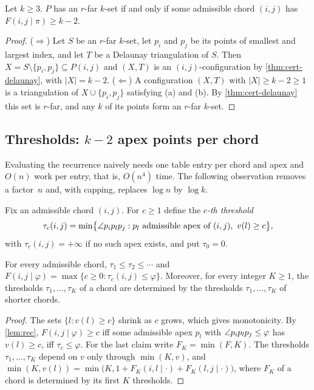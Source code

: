 \begin{theorem}[Decision]\label{thm:decision}
Let $k\ge3$. $P$ has an $r$-far $k$-set if and only if some admissible chord
$(i,j)$ has $F(i,j\mid\pi)\ge k-2$.
\end{theorem}
\begin{proof}
($\Rightarrow$) Let $S$ be an $r$-far $k$-set, let $p_i$ and $p_j$ be its
points of smallest and largest index, and let $T$ be a Delaunay triangulation
of $S$. Then $X=S\setminus\{p_i,p_j\}\subseteq P(i,j)$ and $(X,T)$ is an
$(i,j)$-configuration by \cref{thm:cert-delaunay}, with $|X|=k-2$.
($\Leftarrow$) A configuration $(X,T)$ with $|X|\ge k-2\ge 1$ is a
triangulation of $X\cup\{p_i,p_j\}$ satisfying (a) and (b). By
\cref{thm:cert-delaunay} this set is $r$-far, and any $k$ of its points form
an $r$-far $k$-set.
\end{proof}

\subsection{Thresholds: \texorpdfstring{$k-2$}{k-2} apex points per chord}

Evaluating the recurrence naively needs one table entry per chord and apex and
$O(n)$ work per entry, that is, $O(n^4)$ time. The following observation
removes a factor~$n$ and, with capping, replaces $\log n$ by $\log k$.

Fix an admissible chord $(i,j)$. For $c\ge1$ define the \emph{$c$-th
threshold}
\[
\tau_c(i,j)=\min\bigl\{\angle p_ip_lp_j : p_l\text{ admissible apex of }(i,j),\ v(l)\ge c\bigr\},
\]
with $\tau_c(i,j)=+\infty$ if no such apex exists, and put $\tau_0=0$.

\begin{lemma}\label{lem:thresholds}
For every admissible chord, $\tau_1\le\tau_2\le\cdots$ and
$F(i,j\mid\varphi)=\max\{c\ge0:\tau_c(i,j)\le\varphi\}$. Moreover, for every
integer $K\ge1$, the thresholds $\tau_1,\dots,\tau_K$ of a chord are determined
by the thresholds $\tau_1,\dots,\tau_K$ of shorter chords.
\end{lemma}
\begin{proof}
The sets $\{l:v(l)\ge c\}$ shrink as $c$ grows, which gives monotonicity. By
\cref{lem:rec}, $F(i,j\mid\varphi)\ge c$ iff some admissible apex $p_l$ with
$\angle p_ip_lp_j\le\varphi$ has $v(l)\ge c$, iff $\tau_c\le\varphi$. For the
last claim write $F_K=\min(F,K)$. The thresholds $\tau_1,\dots,\tau_K$ depend
on $v$ only through $\min(K,v)$, and
$\min(K,v(l))=\min\bigl(K,1+F_K(i,l\mid\cdot)+F_K(l,j\mid\cdot)\bigr)$, where
$F_K$ of a chord is determined by its first $K$ thresholds.
\end{proof}

